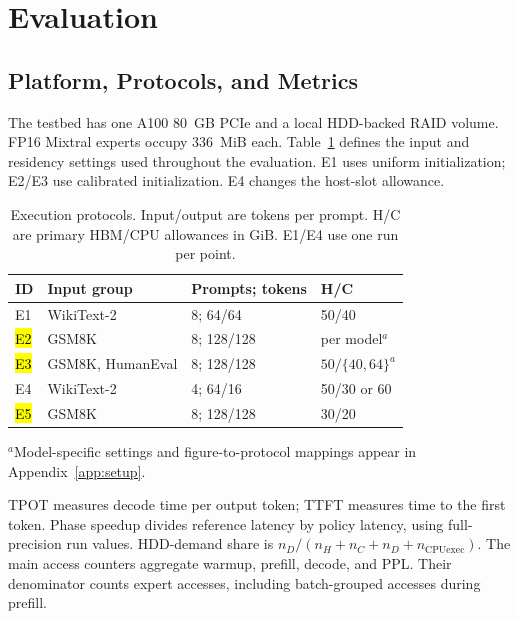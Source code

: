 \documentclass[conference,9pt,letterpaper]{IEEEtran}
\DeclareRobustCommand{\pending}[1]{{\sethlcolor{yellow}\hl{#1}}}
\begin{document}
\section{Evaluation}
\label{sec:evaluation}
\subsection{Platform, Protocols, and Metrics}
The testbed has one A100 80~GB PCIe and a local HDD-backed RAID volume. FP16 Mixtral experts occupy 336~MiB each. Table~\ref{tab:protocols} defines the input and residency settings used throughout the evaluation. E1 uses uniform initialization; E2/E3 use calibrated initialization. E4 changes the host-slot allowance.

\begin{table}[H]
\centering
\caption{Execution protocols. Input/output are tokens per prompt. H/C are primary HBM/CPU allowances in GiB. E1/E4 use one run per point.}
\label{tab:protocols}
\setlength{\tabcolsep}{3pt}
\renewcommand{\arraystretch}{1.10}
\begin{tabular}{@{}lp{0.94in}p{0.70in}p{0.72in}@{}}
\toprule
ID & Input group & Prompts; tokens & H/C \\
\midrule
E1 & WikiText-2 & 8; 64/64 & 50/40 \\
\pending{E2} & GSM8K & 8; 128/128 & per model$^{a}$ \\
\pending{E3} & GSM8K, HumanEval & 8; 128/128 & $50/\{40,64\}^{a}$ \\
E4 & WikiText-2 & 4; 64/16 & 50/30 or 60 \\
\pending{E5} & GSM8K & 8; 128/128 & 30/20 \\
\bottomrule
\end{tabular}
\par\smallskip
\raggedright $^{a}$Model-specific settings and figure-to-protocol mappings appear in Appendix~\ref{app:setup}.
\end{table}

TPOT measures decode time per output token; TTFT measures time to the first token. Phase speedup divides reference latency by policy latency, using full-precision run values. HDD-demand share is $n_D/(n_H+n_C+n_D+n_{\mathrm{CPUexec}})$. The main access counters aggregate warmup, prefill, decode, and PPL. Their denominator counts expert accesses, including batch-grouped accesses during prefill.
\end{document}
